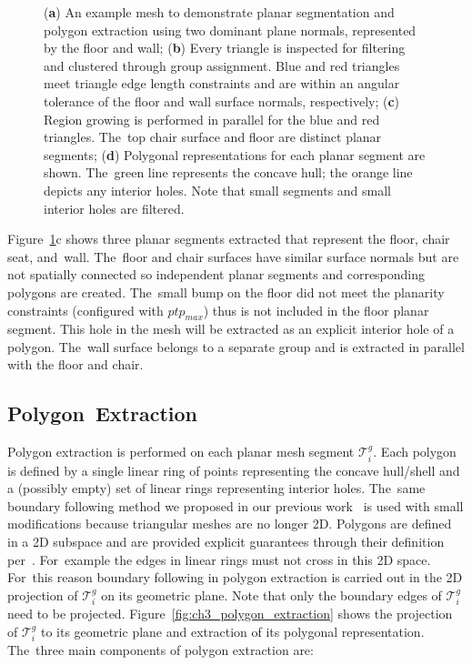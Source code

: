 \begin{figure}[!ht]
  \caption[Demonstration of Polylidar3D extracting planes and their polygonal representations]{(\textbf{a}) An example mesh to demonstrate planar segmentation and polygon extraction using two dominant plane normals, represented by the floor and wall;
  (\textbf{b}) Every triangle is inspected for filtering and clustered through group assignment. Blue and red triangles meet triangle edge length constraints and are within an angular tolerance of the floor and wall surface normals, respectively; (\textbf{c}) Region growing is performed in parallel for the blue and red triangles. The~top chair surface and floor are distinct planar segments;  (\textbf{d}) Polygonal representations for each planar segment are shown. The~green line represents the concave hull; the orange line depicts any interior holes. Note that small segments and small interior holes are filtered. 
  }\label{fig:ch3_planar_segmenti}
\end{figure}

Figure~\ref{fig:ch3_planar_segmenti}c shows three planar segments extracted that represent the floor, chair seat, and~wall. The~floor and chair surfaces have similar surface normals but are not spatially connected so independent planar segments and corresponding polygons are created. The~small bump on the floor did not meet the planarity constraints (configured with $ptp_{max}$) thus is not included in the floor planar segment. This hole in the mesh will be extracted as an explicit interior hole of a polygon. The~wall surface belongs to a separate group and is extracted in parallel with the floor and chair. 

\subsection{Polygon~Extraction}\label{sec:ch3_methods_polylidar_polygon_extraction}

Polygon extraction is performed on each planar mesh segment $\mathcal{T}^{g}_i$. Each polygon is defined by a single linear ring of points representing the concave hull/shell and a (possibly empty) set of linear rings representing interior holes. The~same boundary following method we proposed in our previous work~\cite{castagno_polylidar_2020} is used with small modifications because triangular meshes are no longer 2D.  Polygons are defined in a 2D subspace and are provided explicit guarantees through their definition per~\cite{herring_opengis_2006-1}. For~example the edges in linear rings must not cross in this 2D space.  For~this reason boundary following in polygon extraction is carried out in the 2D projection of $\mathcal{T}^{g}_i$ on its geometric plane. Note that only the boundary edges of $\mathcal{T}^{g}_i$ need to be projected. Figure~\ref{fig:ch3_polygon_extraction} shows the projection of $\mathcal{T}^{g}_i$ to its geometric plane and extraction of its polygonal representation. The~three main components of polygon extraction are:

